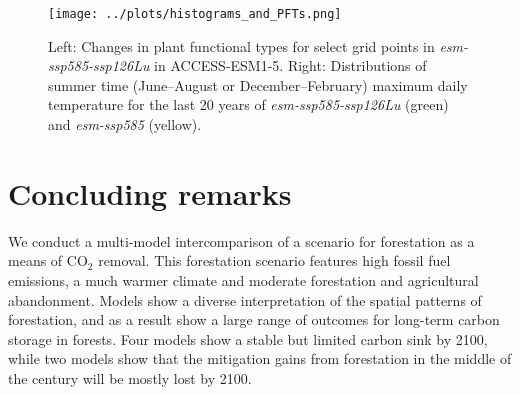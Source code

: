 \documentclass[]{article}
\begin{document}
\begin{figure}[H]
    \centering
    \texttt{[image: ../plots/histograms\_and\_PFTs.png]}
    \caption{Left: Changes in plant functional types for select grid points in \textit{esm-ssp585-ssp126Lu} in ACCESS-ESM1-5. Right: Distributions of summer time (June--August or December--February) maximum daily temperature for the last 20 years of \textit{esm-ssp585-ssp126Lu} (green) and \textit{esm-ssp585} (yellow).}
    \label{fig:tasmax_distribution}
\end{figure}


\section{Concluding remarks}

We conduct a multi-model intercomparison of a scenario for forestation as a means of CO$_2$ removal.
This forestation scenario features high fossil fuel emissions, a much warmer climate and moderate forestation and agricultural abandonment.
Models show a diverse interpretation of the spatial patterns of forestation, and as a result show a large range of outcomes for long-term carbon storage in forests.
Four models show a stable but limited carbon sink by 2100, while two models show that the mitigation gains from forestation in the middle of the century will be mostly lost by 2100.
\end{document}

